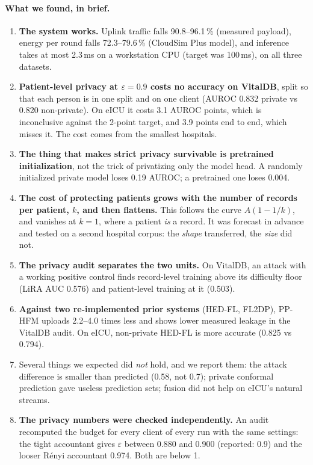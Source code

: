 \documentclass[11pt,a4paper]{article}
\begin{document}
\paragraph{What we found, in brief.}
\begin{enumerate}
\item \textbf{The system works.} Uplink traffic falls 90.8--96.1\,\% (measured
payload), energy per round falls 72.3--79.6\,\% (CloudSim Plus model), and
inference takes at most 2.3\,ms on a workstation CPU (target was 100\,ms), on
all three datasets.
\item \textbf{Patient-level privacy at $\varepsilon = 0.9$ costs no accuracy on
VitalDB}, split so that each person is in one split and on one client (AUROC
0.832 private vs 0.820 non-private). On eICU it costs 3.1 AUROC points, which is
inconclusive against the 2-point target, and 3.9 points end to end, which misses
it. The cost comes from the smallest hospitals.
\item \textbf{The thing that makes strict privacy survivable is pretrained
initialization}, not the trick of privatizing only the model head. A randomly
initialized private model loses 0.19 AUROC; a pretrained one loses 0.004.
\item \textbf{The cost of protecting patients grows with the number of records
per patient, $k$, and then flattens.} This follows the curve $A(1-1/k)$,
and vanishes at $k = 1$, where a patient \emph{is} a record. It was
forecast in advance and tested on a second hospital corpus: the
\emph{shape} transferred, the \emph{size} did not.
\item \textbf{The privacy audit separates the two units.} On VitalDB, an attack
with a working positive control finds record-level training above its
difficulty floor (LiRA AUC 0.576) and patient-level training at it (0.503).
\item \textbf{Against two re-implemented prior systems} (HED-FL, FL2DP),
PP-HFM uploads 2.2--4.0 times less and shows lower measured leakage in the
VitalDB audit. On eICU, non-private HED-FL is more accurate (0.825 vs 0.794).
\item Several things we expected did \emph{not} hold, and we report them: the
attack difference is smaller than predicted (0.58, not 0.7); private conformal
prediction gave useless prediction sets; fusion did not help on eICU's natural
streams.
\item \textbf{The privacy numbers were checked independently.} An audit recomputed
the budget for every client of every run with the same settings: the tight
accountant gives $\varepsilon$ between 0.880 and 0.900 (reported: 0.9) and the
looser R\'enyi accountant 0.974. Both are below 1.
\end{enumerate}
\end{document}

